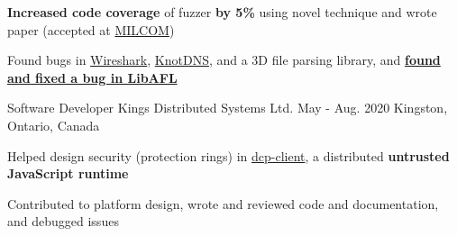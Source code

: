 \begin{cventries}
{\begin{cvitems}
        \item{\textbf{Increased code coverage} of fuzzer \textbf{by 5\%} using novel technique and wrote paper (accepted at \href{https://milcom2023.milcom.org}{MILCOM})} %
        \item{Found bugs in \href{https://www.wireshark.org}{Wireshark}, \href{https://github.com/CZ-NIC/knot}{KnotDNS}, and a 3D file parsing library, and \textbf{\href{https://github.com/AFLplusplus/LibAFL/pull/1317}{found and fixed a bug in LibAFL}}}
      \end{cvitems}
    }

  \cventry
    {Software Developer} %
    {Kings Distributed Systems Ltd.} %
    {May - Aug. 2020} %
    {Kingston, Ontario, Canada} %
    {
      \begin{cvitems} %
        \item{Helped design security (protection rings) in \href{https://www.npmjs.com/package/dcp-client}{dcp-client}, a distributed \textbf{untrusted JavaScript runtime}}
        \item{Contributed to platform design, wrote and reviewed code and documentation, and debugged issues} %
      \end{cvitems}
    }


\end{cventries}
